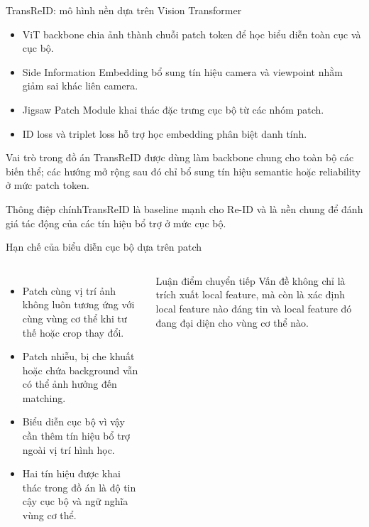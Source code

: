 \documentclass[aspectratio=169,10pt]{beamer}
\newcommand{\keymessage}[1]{\begin{block}{Thông điệp chính}#1\end{block}}
\begin{document}
\begin{frame}{TransReID: mô hình nền dựa trên Vision Transformer}
  \begin{itemize}
    \item ViT backbone chia ảnh thành chuỗi patch token để học biểu diễn toàn cục và cục bộ.
    \item Side Information Embedding bổ sung tín hiệu camera và viewpoint nhằm giảm sai khác liên camera.
    \item Jigsaw Patch Module khai thác đặc trưng cục bộ từ các nhóm patch.
    \item ID loss và triplet loss hỗ trợ học embedding phân biệt danh tính.
  \end{itemize}
  \vspace{.16cm}
  \begin{block}{Vai trò trong đồ án}
    TransReID được dùng làm backbone chung cho toàn bộ các biến thể; các hướng mở rộng sau đó chỉ bổ sung tín hiệu semantic hoặc reliability ở mức patch token.
  \end{block}
  \vspace{.08cm}
  \keymessage{TransReID là baseline mạnh cho Re-ID và là nền chung để đánh giá tác động của các tín hiệu bổ trợ ở mức cục bộ.}
\end{frame}

\begin{frame}{Hạn chế của biểu diễn cục bộ dựa trên patch}
  \begin{columns}[T,onlytextwidth]
    \begin{itemize}
      \item Patch cùng vị trí ảnh không luôn tương ứng với cùng vùng cơ thể khi tư thế hoặc crop thay đổi.
      \item Patch nhiễu, bị che khuất hoặc chứa background vẫn có thể ảnh hưởng đến matching.
      \item Biểu diễn cục bộ vì vậy cần thêm tín hiệu bổ trợ ngoài vị trí hình học.
      \item Hai tín hiệu được khai thác trong đồ án là độ tin cậy cục bộ và ngữ nghĩa vùng cơ thể.
    \end{itemize}
    \begin{block}{Luận điểm chuyển tiếp}
      Vấn đề không chỉ là trích xuất local feature, mà còn là xác định local feature nào đáng tin và local feature đó đang đại diện cho vùng cơ thể nào.
    \end{block}
  \end{columns}
\end{frame}
\end{document}
